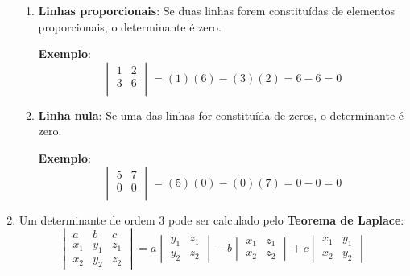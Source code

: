 \begin{enumerate}[label=\alph*)]
\begin{enumerate}[label=\alph{enumi}.\arabic*)]
        \item \textbf{Linhas proporcionais}: Se duas linhas forem constituídas
          de elementos proporcionais, o determinante é zero.
        
        \textbf{Exemplo}:
        \[
          \begin{vmatrix}
            1 & 2 \\
            3 & 6 \\
          \end{vmatrix}
          = (1)(6) - (3)(2) = 6 - 6 = 0
        \]
        
        \item \textbf{Linha nula}: Se uma das linhas for constituída de zeros, o
          determinante é zero.
        
        \textbf{Exemplo}:
        \[
          \begin{vmatrix}
            5 & 7 \\
            0 & 0 \\
          \end{vmatrix}
          = (5)(0) - (0)(7) = 0 - 0 = 0
        \]
    \end{enumerate}
    
    \item Um determinante de ordem 3 pode ser calculado pelo \textbf{Teorema de
      Laplace}:
    \[
      \begin{vmatrix}
        a & b & c \\
        x_1 & y_1 & z_1 \\
        x_2 & y_2 & z_2 
      \end{vmatrix}
      = a\begin{vmatrix}
        y_1 & z_1 \\
        y_2 & z_2 
      \end{vmatrix}
      - b\begin{vmatrix}
        x_1 & z_1 \\
        x_2 & z_2 
      \end{vmatrix}
      + c\begin{vmatrix}
        x_1 & y_1 \\
        x_2 & y_2 
      \end{vmatrix}
    \]
    

\end{enumerate}
